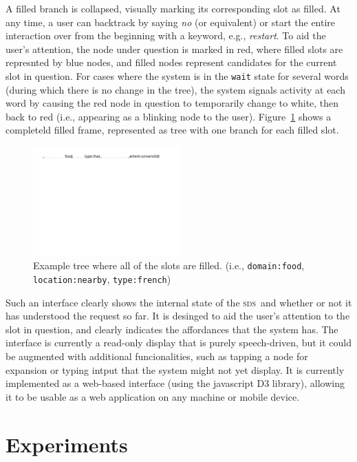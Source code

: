 \documentclass[11pt]{article}
\newcommand{\sds}[0]{\textsc{sds}}
\begin{document}
A filled  branch is collapsed, visually marking its corresponding slot as filled. At any time, a user can backtrack by saying \emph{no} (or equivalent) or start the entire interaction over from the beginning with a keyword, e.g., \emph{restart}. To aid the user's attention, the node under question is marked in red, where filled slots are represnted by blue nodes, and filled nodes represent candidates for the current slot in question. For cases where the system is in the \texttt{wait} state for several words (during which there is no change in the tree), the system signals activity at each word by causing the red node in question to temporarily change to white, then back to red (i.e., appearing as a blinking node to the user). Figure~\ref{fig:filled} shows a completeld filled frame, represented as tree with one branch for each filled slot.

\begin{figure}[ht]
  \centering
      \includegraphics[width=0.5\textwidth]{figures/diatree-filled.pdf}	
      \caption{Example tree where all of the slots are filled. (i.e., \texttt{domain:food}, \texttt{location:nearby}, \texttt{type:french}) \label{fig:filled}}
\end{figure}

Such an interface clearly shows the internal state of the \sds\ and whether or not it has understood the request so far. It is desinged to aid the user's attention to the slot in question, and clearly indicates the affordances that the system has. The interface is currently a read-only display that is purely speech-driven, but it could be augmented with additional funcionalities, such as tapping a node for expansion or typing intput that the system might not yet display. It is currently implemented as a web-based interface (using the javascript D3 library), allowing it to be usable as a web application on any machine or mobile device. 


\section{Experiments}
\label{section:experiments}
\end{document}
